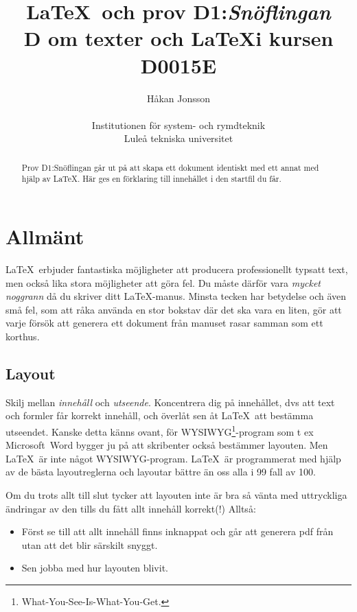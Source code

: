 \documentclass[a4paper,12pt]{article}
\title{\LaTeX\ och prov D1:\emph{Snöflingan} \\
       D om texter och \LaTeX i kursen D0015E}
\author{Håkan Jonsson\\ ~\\ Institutionen för system- och
  rymdteknik \\ Luleå tekniska universitet}
\begin{document}
\maketitle

\begin{abstract}
  Prov D1:Snöflingan går ut på att skapa ett dokument identiskt med
  ett annat med hjälp av \LaTeX. Här ges en förklaring till innehållet
  i den startfil  du får.  
\end{abstract}

\section{Allmänt}

\LaTeX\ erbjuder fantastiska möjligheter att producera professionellt
typsatt text, men också lika stora möjligheter att göra fel. Du måste
därför vara \emph{mycket noggrann} då du skriver ditt
\LaTeX-manus. Minsta tecken har betydelse och även små fel, som att
råka använda en stor bokstav där det ska vara en liten, gör att varje
försök att generera ett dokument från manuset rasar samman som ett
korthus.
%
\begin{center}
  \noindent
\end{center}

\subsection{Layout}

Skilj mellan \emph{innehåll} och \emph{utseende}. Koncentrera dig på
innehållet, dvs att text och formler får korrekt innehåll, och överlåt
sen åt \LaTeX\ att bestämma utseendet. Kanske detta känns ovant, för
WYSIWYG\footnote{What-You-See-Is-What-You-Get.}-program som t ex
Microsoft~Word bygger ju på att skribenter också bestämmer
layouten. Men \LaTeX\ är inte något WYSIWYG-program. \LaTeX\ är
programmerat med hjälp av de bästa layoutreglerna och layoutar bättre
än oss alla i 99 fall av 100.

Om du trots allt till slut tycker att layouten inte är bra så vänta
med uttryckliga ändringar av den tills du fått allt innehåll
korrekt(!) Alltså:

\begin{itemize}
  \item Först se till att allt innehåll finns inknappat och går att
    generera pdf från utan att det blir särskilt snyggt.
  \item Sen jobba med hur layouten blivit. 
  \end{itemize}
  
\end{document}
